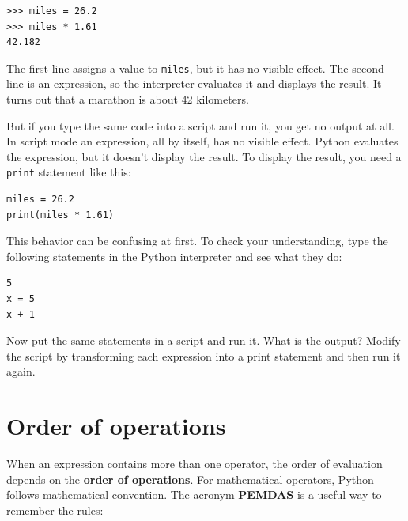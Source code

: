 \documentclass[10pt]{book}
\begin{document}
\begin{verbatim}
>>> miles = 26.2
>>> miles * 1.61
42.182
\end{verbatim}

The first line assigns a value to {\tt miles}, but it has no visible
effect.  The second line is an expression, so the
interpreter evaluates it and displays the result.  It turns out that a
marathon is about 42 kilometers.

But if you type the same code into a script and run it, you get no
output at all.  
In script mode an expression, all by itself, has no
visible effect.  Python evaluates the expression, but it doesn't
display the result.
To display the result, you need a {\tt print} statement like this:

\begin{verbatim}
miles = 26.2
print(miles * 1.61)
\end{verbatim}

This behavior can be confusing at first.
To check your understanding, type the following statements in the
Python interpreter and see what they do:

\begin{verbatim}
5
x = 5
x + 1
\end{verbatim}

Now put the same statements in a script and run it.  What
is the output?  Modify the script by transforming each
expression into a print statement and then run it again.


\section{Order of operations}

When an expression contains more than one operator, the order of
evaluation depends on the {\bf order of operations}.  For
mathematical operators, Python follows mathematical convention.
The acronym {\bf PEMDAS} is a useful way to
remember the rules:
\end{document}
